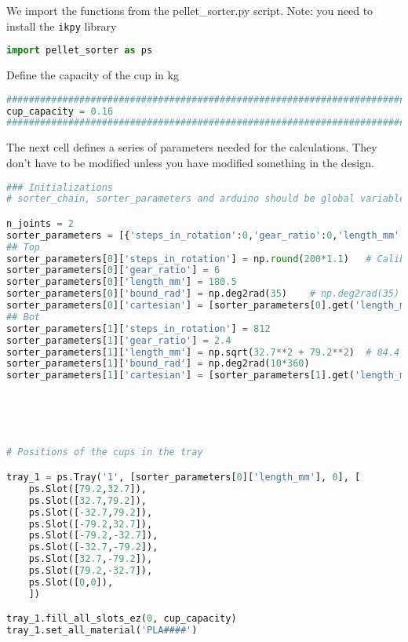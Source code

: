 We import the functions from the pellet\_sorter.py script. Note: you
need to install the \passthrough{\lstinline!ikpy!} library

\begin{lstlisting}[language=Python]
import pellet_sorter as ps
\end{lstlisting}

Define the capacity of the cup in kg

\begin{lstlisting}[language=Python]
###############################################################################################################
cup_capacity = 0.16
###############################################################################################################
\end{lstlisting}

The next cell defines a series of parameters needed for the
calculations. They don't have to be modified unless you have modified
something in the design.

\begin{lstlisting}[language=Python]
### Initializations
# sorter_chain, sorter_parameters and arduino should be global variables

n_joints = 2
sorter_parameters = [{'steps_in_rotation':0,'gear_ratio':0,'length_mm':0,'bound_rad':0, 'cartesian':[0,0]} for k in range(n_joints)]
## Top
sorter_parameters[0]['steps_in_rotation'] = np.round(200*1.1)   # Calibrate multiplicative factor to compensate lost steps if necessary
sorter_parameters[0]['gear_ratio'] = 6
sorter_parameters[0]['length_mm'] = 180.5
sorter_parameters[0]['bound_rad'] = np.deg2rad(35)    # np.deg2rad(35)  # IK Rotation bound in either direction, not total
sorter_parameters[0]['cartesian'] = [sorter_parameters[0].get('length_mm'), 0]
## Bot
sorter_parameters[1]['steps_in_rotation'] = 812
sorter_parameters[1]['gear_ratio'] = 2.4
sorter_parameters[1]['length_mm'] = np.sqrt(32.7**2 + 79.2**2)  # 84.4
sorter_parameters[1]['bound_rad'] = np.deg2rad(10*360)
sorter_parameters[1]['cartesian'] = [sorter_parameters[1].get('length_mm'), 0]





# Positions of the cups in the tray

tray_1 = ps.Tray('1', [sorter_parameters[0]['length_mm'], 0], [
    ps.Slot([79.2,32.7]),
    ps.Slot([32.7,79.2]),
    ps.Slot([-32.7,79.2]),
    ps.Slot([-79.2,32.7]),
    ps.Slot([-79.2,-32.7]),
    ps.Slot([-32.7,-79.2]),
    ps.Slot([32.7,-79.2]),
    ps.Slot([79.2,-32.7]),
    ps.Slot([0,0]), 
    ])

tray_1.fill_all_slots_ez(0, cup_capacity)
tray_1.set_all_material('PLA####')
\end{lstlisting}

